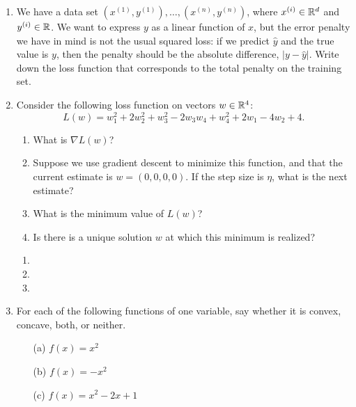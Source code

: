 \documentclass[10pt]{report}
\begin{document}


\begin{enumerate}

\item We have a data set $(x^{(1)}, y^{(1)}), \ldots, (x^{(n)}, y^{(n)})$, where $x^{(i)} \in {\mathbb R}^d$ and $y^{(i)} \in {\mathbb R}$. We want to express $y$ as a linear function of $x$, but the error penalty we have in mind is not the usual squared loss: if we predict $\widehat{y}$ and the true value is $y$, then the penalty should be the absolute difference, $|y - \widehat{y}|$. Write down the loss function that corresponds to the total penalty on the training set.
\begin{solution}

\end{solution}

\item Consider the following loss function on vectors $w \in {\mathbb R}^4$:
$$ L(w) = w_1^2 + 2 w_2^2 + w_3^2 - 2w_3w_4 + w_4^2 + 2w_1 - 4w_2 + 4 .$$
\begin{enumerate}
\item What is $\nabla L(w)$?
\item Suppose we use gradient descent to minimize this function, and that the current estimate is $w = (0,0,0,0)$. If the step size is $\eta$, what is the next estimate?
\item What is the minimum value of $L(w)$?
\item Is there is a unique solution $w$ at which this minimum is realized?
\end{enumerate}
\begin{solution}
  \begin{enumerate}
    \item 
    \item 
    \item 
  \end{enumerate}
\end{solution}

\item For each of the following functions of one variable, say whether it is convex, concave, both, or neither.
\begin{enumerate}
\item[(a)] $f(x) = x^2$
\item[(b)] $f(x) = -x^2$

\item[(c)] $f(x) = x^2 - 2x + 1$


\end{enumerate}
\end{enumerate}
\end{document}
